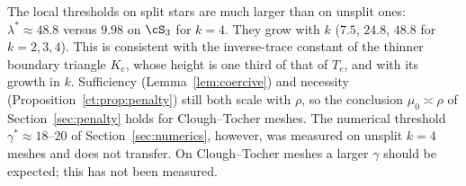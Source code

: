 \begin{remark}
The local thresholds on split stars are much larger than on unsplit ones: $\lambda^\ast\approx48.8$ versus $9.98$ on $\cS_3$ for $k=4$. They grow with $k$ ($7.5$, $24.8$, $48.8$ for $k=2,3,4$). This is consistent with the inverse-trace constant of the thinner boundary triangle $K_e$, whose height is one third of that of $T_e$, and with its growth in $k$. Sufficiency (Lemma~\ref{lem:coercive}) and necessity (Proposition~\ref{ct:prop:penalty}) still both scale with $\rho$, so the conclusion $\mu_0\asymp\rho$ of Section~\ref{sec:penalty} holds for Clough--Tocher meshes. The numerical threshold $\gamma^\ast\approx18$--$20$ of Section~\ref{sec:numerics}, however, was measured on unsplit $k=4$ meshes and does not transfer. On Clough--Tocher meshes a larger $\gamma$ should be expected; this has not been measured.
\end{remark}
